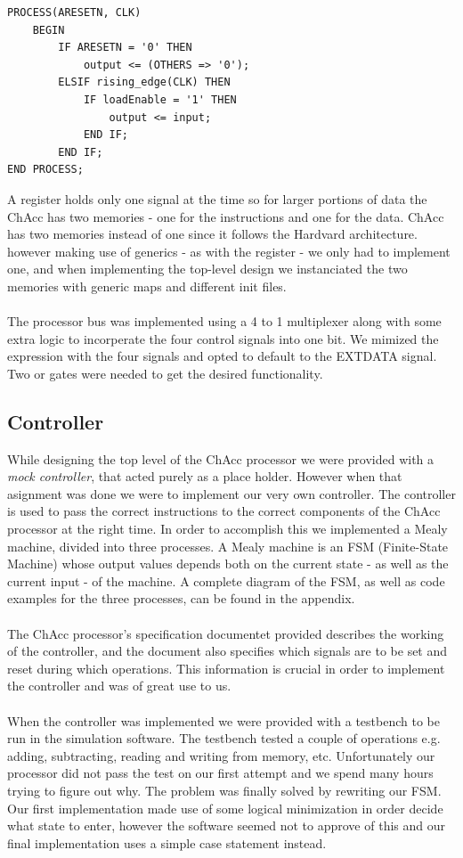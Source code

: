\documentclass[a4paper,11pt]{article}
\begin{document}
\begin{lstlisting}[frame=single]
PROCESS(ARESETN, CLK)
    BEGIN
        IF ARESETN = '0' THEN
            output <= (OTHERS => '0');
        ELSIF rising_edge(CLK) THEN
            IF loadEnable = '1' THEN
                output <= input;
            END IF;
        END IF;
END PROCESS;
\end{lstlisting}

\noindent
A register holds only one signal at the time so for larger portions of data 
the ChAcc has two memories - one for the instructions and one for the data. 
ChAcc has two memories instead of one since it follows the Hardvard 
architecture. however making use of generics - as with the register - we only 
had to implement one, and when implementing the top-level design we 
instanciated the two memories with generic maps and different init files.\\\\
\noindent
The processor bus was implemented using a 4 to 1 multiplexer along with some 
extra logic to incorperate the four control signals into one bit. We mimized 
the expression with the four signals and opted to default to the EXTDATA 
signal. Two or gates were needed to get the desired functionality.

\subsection{Controller}
While designing the top level of the ChAcc processor we were provided with a 
{\it mock controller}, that acted purely as a place holder. However when that 
asignment was done we were to implement our very own controller. The 
controller is used to pass the correct instructions to the correct components 
of the ChAcc processor at the right time. In order to accomplish this we 
implemented a Mealy machine, divided into three processes. A Mealy machine is 
an FSM (Finite-State Machine) whose output values depends both on the current 
state - as well as the current input - of the machine. A complete diagram of 
the FSM, as well as code examples for the three processes, can be found in 
the appendix.\\\\
\noindent
The ChAcc processor's specification documentet provided describes the working 
of the controller, and the document also specifies which signals are to be set 
and reset during which operations. This information is crucial in order to 
implement the controller and was of great use to us.\\\\
\noindent
When the controller was implemented we were provided with a testbench to be 
run in the simulation software. The testbench tested a couple of operations 
e.g. adding, subtracting, reading and writing from memory, etc. Unfortunately 
our processor did not pass the test on our first attempt and we spend many 
hours trying to figure out why. The problem was finally solved by rewriting 
our FSM. Our first implementation made use of some logical minimization in 
order decide what state to enter, however the software seemed not to approve 
of this and our final implementation uses a simple case statement instead.
\end{document}
